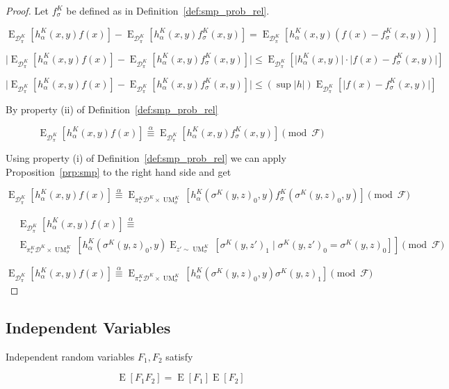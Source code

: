 \documentclass[11pt]{article}
\numberwithin{equation}{section}
\theoremstyle{definition}
\theoremstyle{plain}
\DeclareMathOperator{\E}{E}
\DeclareMathOperator{\UM}{UM}
\newcommand{\Abs}[1]{\lvert #1 \rvert}
\newcommand{\Dist}{\mathcal{D}}
\newcommand{\Fall}{\mathcal{F}}
\begin{document}
\begin{proof}

Let ${f_\sigma^K}$ be defined as in Definition~\ref{def:smp_prob_rel}.

$$\E_{\Dist_\pi^K}[h_\alpha^K(x,y)f(x)]-\E_{\Dist_\pi^K}[h_\alpha^K(x,y)f_\sigma^K(x,y)]=\E_{\Dist_\pi^K}[h_\alpha^K(x,y)(f(x)-f_\sigma^K(x,y))]$$

$$\Abs{\E_{\Dist_\pi^K}[h_\alpha^K(x,y)f(x)]-\E_{\Dist_\pi^K}[h_\alpha^K(x,y)f_\sigma^K(x,y)]} \leq \E_{\Dist_\pi^K}[\Abs{h_\alpha^K(x,y)} \cdot \Abs{f(x)-f_\sigma^K(x,y)}]$$

$$\Abs{\E_{\Dist_\pi^K}[h_\alpha^K(x,y)f(x)]-\E_{\Dist_\pi^K}[h_\alpha^K(x,y)f_\sigma^K(x,y)]} \leq (\sup \Abs{h}) \E_{\Dist_\pi^K}[\Abs{f(x)-f_\sigma^K(x,y)}]$$

By property (ii) of Definition~\ref{def:smp_prob_rel}

$$\E_{\Dist_\pi^K}[h_\alpha^K(x,y)f(x)] \overset{\alpha}{\equiv} \E_{\Dist_\pi^K}[h_\alpha^K(x,y)f_\sigma^K(x,y)] \pmod \Fall$$

Using property (i) of Definition~\ref{def:smp_prob_rel} we can apply Proposition~\ref{prp:smp} to the right hand side and get

$$\E_{\Dist_\pi^K}[h_\alpha^K(x,y)f(x)] \overset{\alpha}{\equiv} \E_{\pi_*^K\Dist^{K} \times \UM_\sigma^K}[h_\alpha^K(\sigma^K(y,z)_0,y) f_\sigma^K(\sigma^K(y,z)_0,y)] \pmod \Fall$$

\begin{align*}
&\E_{\Dist_\pi^K}[h_\alpha^K(x,y)f(x)] \overset{\alpha}{\equiv}\\ &\E_{\pi_*^K\Dist^{K} \times \UM_\sigma^K}[h_\alpha^K(\sigma^K(y,z)_0,y) \E_{z' \sim\UM_\sigma^K}[\sigma^K(y,z')_1 \mid \sigma^K(y,z')_0 = \sigma^K(y,z)_0]] \pmod \Fall
\end{align*}

$$\E_{\Dist_\pi^K}[h_\alpha^K(x,y)f(x)] \overset{\alpha}{\equiv} \E_{\pi_*^K\Dist^{K} \times \UM_\sigma^K}[h_\alpha^K(\sigma^K(y,z)_0,y) \sigma^K(y,z)_1] \pmod \Fall$$
\end{proof}

\subsection{Independent Variables}
\label{subsec:indep_var}

Independent random variables $F_1, F_2$ satisfy 

\begin{equation}
\label{eqn:ev_mult}
\E[F_1 F_2] = \E[F_1] \E[F_2]
\end{equation}
\end{document}
